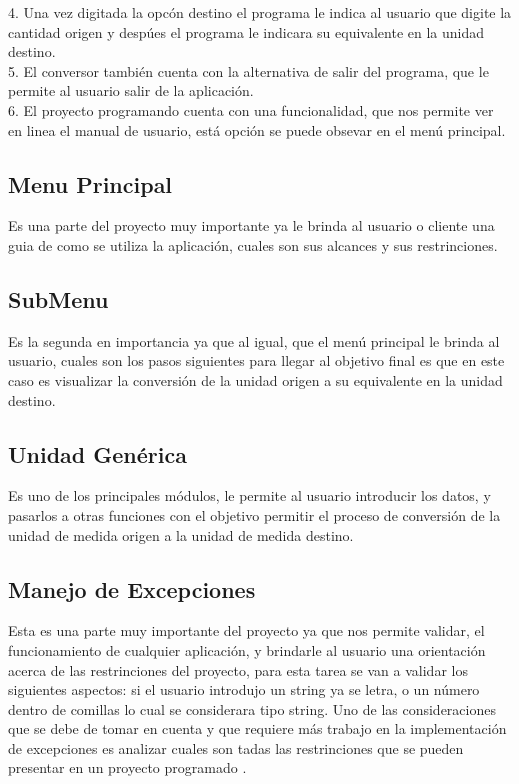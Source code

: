 \documentclass[times,12pt]{article}
\begin{document}
4. Una vez digitada la opc\'on destino el programa le indica al usuario que digite la cantidad origen y desp\'ues el programa le indicara su equivalente en la unidad destino.\\

5. El conversor tambi\'en cuenta con la alternativa de salir del programa, que le permite al usuario salir de la aplicaci\'on.\\

6. El proyecto programando cuenta con una funcionalidad, que nos permite ver en linea el manual de usuario, est\'a opci\'on se puede obsevar en el men\'u principal.\\


\subsection{Menu Principal}

Es una parte del proyecto muy importante ya le brinda al usuario o cliente una guia de como se utiliza la aplicaci\'on, cuales son sus alcances y sus restrinciones.\\ 

\subsection{SubMenu}

Es la segunda en importancia ya que al igual, que el men\'u principal le brinda al usuario, cuales son los pasos siguientes para llegar al objetivo final es que en este caso es visualizar la conversi\'on de la unidad origen a su equivalente en la unidad destino.\\ 

\subsection{Unidad Gen\'erica}

Es uno de los principales m\'odulos, le permite al usuario introducir los datos, y pasarlos a otras funciones con el objetivo permitir el proceso de conversi\'on de la unidad de medida origen a la unidad de medida destino.\\ 

\subsection{Manejo de Excepciones}
Esta es una parte muy importante del proyecto ya que nos permite validar, el funcionamiento de cualquier aplicaci\'on, y brindarle al usuario una orientaci\'on acerca de las restrinciones del proyecto, para esta tarea se van a validar los siguientes aspectos: si el usuario introdujo un string ya se letra, o un  n\'umero dentro de comillas lo cual se considerara tipo string. Uno de las consideraciones que se debe de tomar en cuenta y que requiere m\'as trabajo en la implementaci\'on de excepciones es analizar cuales son tadas las restrinciones que se pueden presentar en un proyecto programado .\\ 
\end{document}
